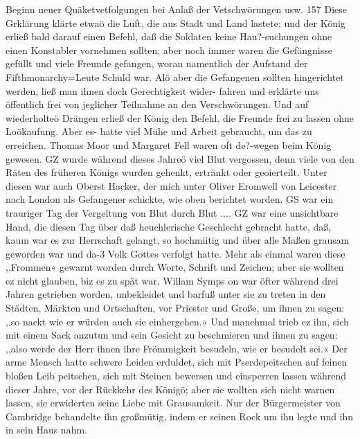 Beginn neuer Quäketvetfolgungen bei Anlaß der Vetschwörungen usw. 157
Diese Grklärung klärte etwaö die Luft, die aus Stadt und
Land lastete; und der König erließ bald darauf einen Befehl,
daß die Soldaten keine Hau?-suchungen ohne einen Konstabler
vornehmen sollten; aber noch immer waren die Gefängnisse gefüllt
und viele Freunde gefangen, woran namentlich der Aufstand der
Fifthmonarchy=Leute Schuld war. Alö aber die Gefangenen
sollten hingerichtet werden, ließ man ihnen doch Gerechtigkeit wider-
fahren und erklärte uns öffentlich frei von jeglicher Teilnahme an
den Verschwörungen. Und auf wiederholteö Drängen erließ der
König den Befehl, die Freunde frei zu lassen ohne Loökaufung.
Aber es- hatte viel Mühe und Arbeit gebraucht, um das zu
erreichen. Thomas Moor und Margaret Fell waren oft de?-wegen
beim König gewesen.
GZ wurde während dieses Jahreö viel Blut vergossen, denn
viele von den Räten des früheren Königs wurden gehenkt, ertränkt
oder geoierteilt. Unter diesen war auch Oberst Hacker, der mich
unter Oliver Eromwell von Leicester nach London als Gefangener
schickte, wie oben berichtet worden. GS war ein trauriger Tag
der Vergeltung von Blut durch Blut ....
GZ war eine unsichtbare Hand, die diesen Tag über daß
heuchlerische Geschlecht gebracht hatte, daß, kaum war es zur
Herrschaft gelangt, so hochmiitig und über alle Maßen grausam
geworden war und da-3 Volk Gottes verfolgt hatte.
Mehr als einmal waren diese ,,Frommen« gewarnt worden
durch Worte, Schrift und Zeichen; aber sie wollten ez nicht
glauben, biz es zu spät war. Willam Symps on war öfter während
drei Jahren getrieben worden, unbekleidet und barfuß unter sie
zu treten in den Städten, Märkten und Ortschaften, vor Priester
und Große, um ihnen zu sagen: ,,so nackt wie er würden auch sie
einhergehen.« Und manchmal trieb ez ihn, sich mit einem Sack
anzutun und sein Gesicht zu beschmieren und ihnen zu sagen:
,,also werde der Herr ihnen ihre Frömmigkeit besudeln, wie er
besudelt sei.« Der arme Mensch hatte schwere Leiden erduldet,
sich mit Pserdepeitschen auf feinen bloßen Leib peitschen, sich mit
Steinen bewersen und einsperren lassen während dieser Jahre, vor
der Rückkehr des Königö; aber sie wollten sich nicht warnen
lassen, sie erwiderten seine Liebe mit Grausamkeit. Nur der
Bürgermeister von Cambridge behandelte ihn großmütig, indem
er seinen Rock um ihn legte und ihn in sein Haus nahm.


